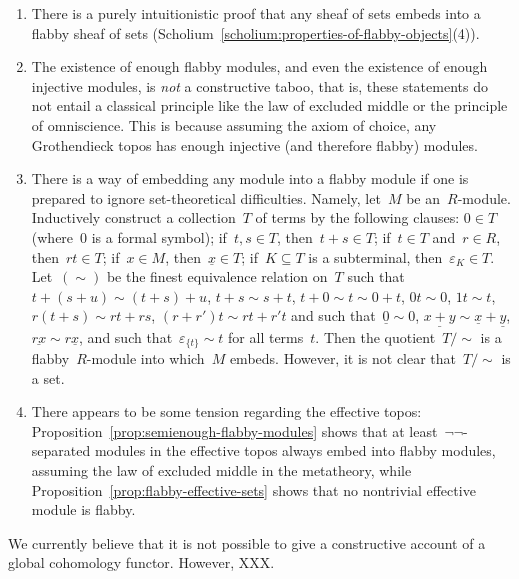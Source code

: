 \documentclass[oneside]{amsart}
\theoremstyle{definition}
\theoremstyle{plain}
\theoremstyle{remark}
\renewcommand{\_}{\mathpunct{.}\,}
\begin{document}
\begin{enumerate}
\item There is a purely intuitionistic proof that any sheaf of sets embeds into
a flabby sheaf of sets
(Scholium~\ref{scholium:properties-of-flabby-objects}(4)).

\item The existence of enough flabby modules, and even the existence of enough
injective modules, is \emph{not} a constructive taboo, that is, these statements do not
entail a classical principle like the law of excluded middle or the principle
of omniscience. This is because assuming the axiom of choice, any
Grothendieck topos has enough injective (and therefore flabby) modules. 

\item There is a way of embedding any module into a flabby module if one is
prepared to ignore set-theoretical difficulties. Namely, let~$M$ be an~$R$-module.
Inductively construct a collection~$T$ of terms by the following clauses: $0
\in T$ (where~$0$ is a formal symbol);
if~$t,s \in T$, then~$t + s \in T$; if~$t \in T$ and~$r \in R$, then~$rt \in
T$; if~$x \in M$, then~$\underline{x} \in T$; if~$K \subseteq T$ is a
subterminal, then~$\varepsilon_K \in T$. Let~$({\sim})$ be
the finest equivalence relation on~$T$ such that~$t + (s + u) \sim (t + s) +
u$, $t + s \sim s + t$, $t + 0 \sim t \sim 0 + t$, $0t \sim 0$, $1t \sim t$, $r(t+s) \sim rt
+ rs$, $(r+r')t \sim rt + r't$ and such
that~$\underline{0} \sim 0$, $\underline{x+y} \sim \underline{x} + \underline{y}$, $\underline{rx} \sim
r \underline{x}$, and such that~$\varepsilon_{\{t\}} \sim
t$ for all terms~$t$. Then the quotient~$T/{\sim}$ is a flabby~$R$-module
into which~$M$ embeds. However, it is not clear that~$T/{\sim}$ is a set.

\item There appears to be some tension regarding the effective topos:
Proposition~\ref{prop:semienough-flabby-modules} shows that at
least~$\neg\neg$-separated modules in the effective topos always embed into
flabby modules, assuming the law of excluded middle in the metatheory, while
Proposition~\ref{prop:flabby-effective-sets} shows that no nontrivial effective
module is flabby.
\end{enumerate}

We currently believe that it is not possible to give a constructive account of
a global cohomology functor. However, XXX.
\end{document}
